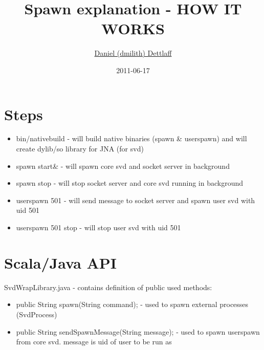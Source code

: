 \documentclass[11pt,a4paper]{report}
\title{Spawn explanation - HOW IT WORKS}
\author{\href{mailto:dmilith@verknowsys.com}{Daniel (dmilith) Dettlaff}}
\date{2011-06-17}
\begin{document}
\maketitle

\section{Steps}\label{sec:steps}
	\begin{itemize}
		\item bin/nativebuild - will build native binaries (spawn \& userspawn) and will create dylib/so library for JNA (for svd)
		\item spawn start\& - will spawn core svd and socket server in background
		\item spawn stop - will stop socket server and core svd running in background
		\item userspawn 501 - will send message to socket server and spawn user svd with uid 501
		\item userspawn 501 stop - will stop user svd with uid 501
	\end{itemize}

\section{Scala/Java API}\label{sec:steps}
	SvdWrapLibrary.java - contains definition of public used methods:
	\begin{itemize}
		\item public String spawn(String command); - used to spawn external processes (SvdProcess)
		\item public String sendSpawnMessage(String message); - used to spawn userspawn from core svd. message is uid of user to be run as
	\end{itemize}

	
\end{document}
